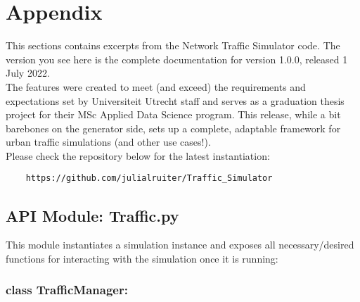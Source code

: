 \chapter{Appendix}
\label{Appendix}

\par This sections contains excerpts from the Network Traffic Simulator code.  The version you see here is the complete documentation for version 1.0.0, released  1 July 2022.  \\

\noindent The features were created to meet (and exceed) the requirements and expectations set  by Universiteit Utrecht staff and serves as a graduation thesis project for their MSc Applied Data Science program.  This release, while a bit barebones on the generator side, sets up a complete, adaptable framework for urban traffic simulations (and other use cases!). \\

\noindent Please check the repository below for the latest instantiation:
\begin{verbatim}
    https://github.com/julialruiter/Traffic_Simulator
\end{verbatim} 

\section{API Module: Traffic.py}
This module instantiates a simulation instance and exposes all necessary/desired functions for interacting with the simulation once it is running:

\subsection{class TrafficManager:}

